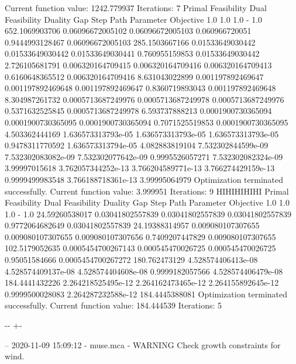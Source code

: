 \documentclass[letterpaper,10pt,english]{sphinxmanual}
\newlength\nbsphinxcodecellspacing
\begin{document}
{\begin{sphinxVerbatim}[commandchars=\\\{\}]
         Current function value: 1242.779937
         Iterations: 7
Primal Feasibility  Dual Feasibility    Duality Gap         Step             Path Parameter      Objective
1.0                 1.0                 1.0                 -                1.0                 652.1069903706
0.06096672005102    0.06096672005103    0.060966720051      0.9444993128467  0.06096672005103    285.1503667166
0.01533649030442    0.01533649030442    0.01533649030441    0.760955159853   0.01533649030442    2.726105681791
0.006320164709415   0.006320164709416   0.006320164709413   0.6160648365512  0.006320164709416   8.631043022899
0.001197892469647   0.001197892469648   0.001197892469647   0.8360719893043  0.001197892469648   8.304987261732
0.0005713687249976  0.0005713687249978  0.0005713687249976  0.5371632525845  0.0005713687249978  6.593737888213
0.0001900730365094  0.0001900730365095  0.0001900730365094  0.7071525519853  0.0001900730365095  4.503362444169
1.636573313793e-05  1.636573313793e-05  1.636573313793e-05  0.9478311770592  1.636573313794e-05  4.082883819104
7.532302844599e-09  7.532302083082e-09  7.532302077642e-09  0.9995526057271  7.532302082324e-09  3.99997015618
3.762057344252e-13  3.766204589771e-13  3.766274429159e-13  0.9999499983548  3.766188718361e-13  3.99995064979
Optimization terminated successfully.
         Current function value: 3.999951
         Iterations: 9
HIHIHIHIHI
Primal Feasibility  Dual Feasibility    Duality Gap         Step             Path Parameter      Objective
1.0                 1.0                 1.0                 -                1.0                 24.59260538017
0.03041802557839    0.03041802557839    0.03041802557839    0.9772064682649  0.03041802557839    24.19388314957
0.009080107307655   0.009080107307655   0.009080107307656   0.7409207447829  0.009080107307655   102.5179052635
0.0005454700267143  0.000545470026725   0.000545470026725   0.95051584666    0.0005454700267272  180.762473129
4.528574406413e-08  4.528574409137e-08  4.528574404608e-08  0.9999182057566  4.528574406479e-08  184.4441432226
2.264218525495e-12  2.264162473465e-12  2.264155892645e-12  0.9999500028083  2.264287232588e-12  184.4445388081
Optimization terminated successfully.
         Current function value: 184.444539
         Iterations: 5
\end{sphinxVerbatim}
}

{

\kern-\sphinxverbatimsmallskipamount\kern-\baselineskip
\kern+\FrameHeightAdjust\kern-\fboxrule
\vspace{\nbsphinxcodecellspacing}

\begin{sphinxVerbatim}[commandchars=\\\{\}]
-- 2020-11-09 15:09:12 - muse.mca - WARNING
Check growth constraints for wind.

\end{sphinxVerbatim}
}
\end{document}
